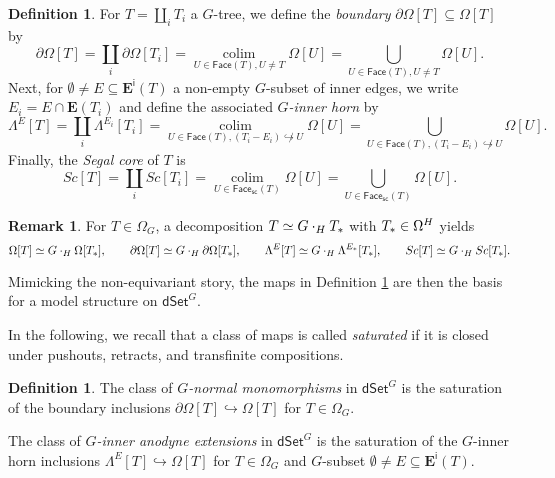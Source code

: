 \documentclass[a4paper,10pt]{article}%
\numberwithin{equation}{section}
\numberwithin{figure}{section}
\theoremstyle{definition} %
\newtheorem{definition}[equation]{Definition}%
\newtheorem{remark}[equation]{Remark}%
\newcommand{\into}{\hookrightarrow}%
\newcommand{\dSet}{\mathsf{dSet}}
\DeclareMathOperator{\colim}{colim}%
\newcommand{\1}{\ensuremath{\mathbbm 1}}%
\begin{document}
\begin{definition}\label{DSETPRESHEAF_DEF}
      For $T = \amalg_i T_i$ a $G$-tree,
      we define the \emph{boundary}
      $\partial \Omega[T] \subseteq \Omega[T]$ by
      \begin{equation}
            \partial \Omega[T]
            = \coprod_i \partial \Omega[T_i]
            = \mathop{\colim}\limits_{U \in \mathsf{Face}(T), U \neq T} \Omega[U]
            = \bigcup_{U \in \mathsf{Face}(T), U \neq T} \Omega[U].
      \end{equation}
      Next, for $\emptyset \neq E \subseteq \boldsymbol{E}^{\mathsf{i}}(T)$ a non-empty $G$-subset of inner edges, we write $E_i = E \cap \boldsymbol{E}(T_i)$
      and define the associated \textit{$G$-inner horn} by
      \begin{equation}\label{GINNERHORN_EQ}
            \Lambda^{E}[T]
            = \coprod_i \Lambda^{E_i}[T_i]
            = \mathop{\colim}\limits_{U \in \mathsf{Face}(T), (T_i - E_i) \not\into U} \Omega[U]
            = \bigcup_{U \in \mathsf{Face}(T), (T_i - E_i) \not\into U} \Omega[U].
      \end{equation}
      Finally, the \textit{Segal core} of $T$ is
      \begin{equation}\label{eq:SC}
            Sc[T] 
            = \coprod_i Sc[T_i]
            = \mathop{\colim}\limits_{U \in \mathsf{Face}_{\mathsf{sc}}(T)} \Omega[U]
            = \bigcup_{U \in \mathsf{Face}_{\mathsf{sc}}(T)} \Omega[U].
      \end{equation}
\end{definition}


\begin{remark}
For $T \in \Omega_G$, a decomposition $T \simeq G \cdot_H T_{\**}$ with $T_{\**} \in \Omega^H$ yields
\[
	\Omega[T] \simeq G \cdot_H \Omega[T_{\**}],
\qquad
	\partial\Omega[T] \simeq G \cdot_H \partial \Omega[T_{\**}],
\qquad
	\Lambda^{E}[T] \simeq G \cdot_H \Lambda^{E_{\**}}[T_{\**}],
\qquad
	Sc[T] \simeq G \cdot_H Sc[T_{\**}].
\]
\end{remark}


Mimicking the non-equivariant story, the maps in Definition \ref{DSETPRESHEAF_DEF} are then the basis for a model structure on $\dSet^G$.

In the following, we recall that a class of maps is called \textit{saturated} if it is closed under pushouts, retracts, and transfinite compositions.

\begin{definition}
	The class of \textit{$G$-normal monomorphisms}
	in $\mathsf{dSet}^G$
	is the saturation of the boundary inclusions 
	$\partial \Omega[T] \into \Omega[T]$ for $T \in \Omega_G$.
	
	The class of \textit{$G$-inner anodyne extensions}
	in $\mathsf{dSet}^G$
	is the saturation of the $G$-inner horn inclusions
	$\Lambda^E [T] \into \Omega[T]$ 
	for $T \in \Omega_G$ and $G$-subset
	$\emptyset \neq E \subseteq
	\boldsymbol{E}^{\mathsf{i}}(T).$
\end{definition}
\end{document}
